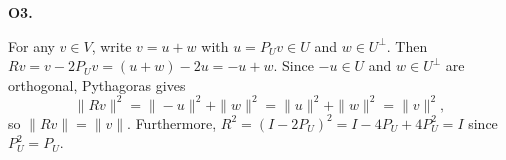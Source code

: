 \documentclass[10pt]{scrartcl}
\begin{document}
\begin{prob}
\textbf{O3. }\par 
{}
For any $v\in V$, write $v=u+w$ with $u=P_U v\in U$ and $w\in U^\perp$. Then $Rv=v-2P_U v=(u+w)-2u=-u+w$. Since $-u\in U$ and $w\in U^\perp$ are orthogonal, Pythagoras gives
\[ \|Rv\|^2=\|-u\|^2+\|w\|^2=\|u\|^2+\|w\|^2=\|v\|^2, \]
so $\|Rv\|=\|v\|$. Furthermore, $R^2=(I-2P_U)^2=I-4P_U+4P_U^2=I$ since $P_U^2=P_U$.
\end{prob}
\end{document}
